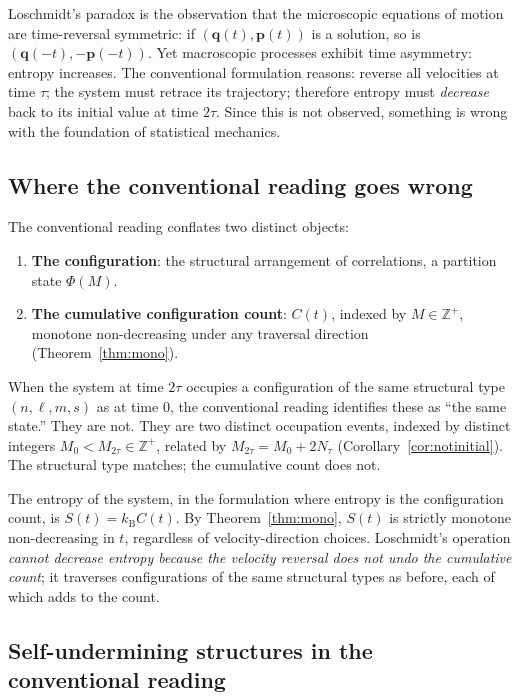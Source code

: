 \documentclass[twocolumn,10pt,a4paper]{article}
\theoremstyle{thmstyle}
\theoremstyle{definition}
\theoremstyle{remark}
\newcommand{\Zp}{\mathbb{Z}^{+}}
\newcommand{\PhiMap}{\varPhi}
\newcommand{\kB}{k_{\mathrm{B}}}
\begin{document}
Loschmidt's paradox is the observation that the microscopic equations
of motion are time-reversal symmetric: if $(\mathbf{q}(t),\mathbf{p}(t))$
is a solution, so is $(\mathbf{q}(-t),-\mathbf{p}(-t))$. Yet macroscopic
processes exhibit time asymmetry: entropy increases. The conventional
formulation reasons: reverse all velocities at time $\tau$; the system
must retrace its trajectory; therefore entropy must \emph{decrease}
back to its initial value at time $2\tau$. Since this is not observed,
something is wrong with the foundation of statistical mechanics.

\subsection{Where the conventional reading goes wrong}

The conventional reading conflates two distinct objects:

\begin{enumerate}[nosep,leftmargin=*]
\item \textbf{The configuration}: the structural arrangement of
correlations, a partition state $\PhiMap(M)$.
\item \textbf{The cumulative configuration count}: $C(t)$, indexed by
$M\in\Zp$, monotone non-decreasing under any traversal direction
(Theorem~\ref{thm:mono}).
\end{enumerate}

When the system at time $2\tau$ occupies a configuration of the same
structural type $(n,\ell,m,s)$ as at time $0$, the conventional reading
identifies these as ``the same state.'' They are not. They are two
distinct occupation events, indexed by distinct integers
$M_{0}<M_{2\tau}\in\Zp$, related by $M_{2\tau}=M_{0}+2N_{\tau}$
(Corollary~\ref{cor:notinitial}). The structural type matches; the
cumulative count does not.

The entropy of the system, in the formulation where entropy is the
configuration count, is $S(t)=\kB C(t)$. By
Theorem~\ref{thm:mono}, $S(t)$ is strictly monotone non-decreasing
in $t$, regardless of velocity-direction choices. Loschmidt's
operation \emph{cannot decrease entropy because the velocity reversal
does not undo the cumulative count}; it traverses configurations of
the same structural types as before, each of which adds to the count.

\subsection{Self-undermining structures in the conventional reading}
\end{document}
